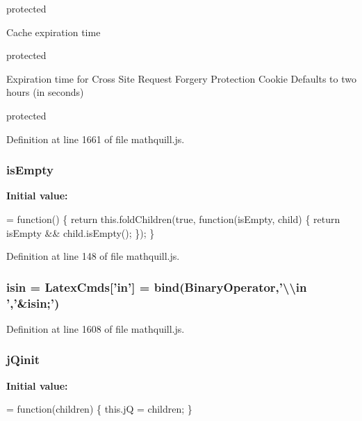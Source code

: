 protected

Cache expiration time

protected

Expiration time for Cross Site Request Forgery Protection Cookie Defaults to two hours (in seconds)

protected 

Definition at line 1661 of file mathquill.\-js.

\subsubsection[{is\-Empty}]{\setlength{\rightskip}{0pt plus 5cm}{\bf \-\_\-} is\-Empty}\label{mathquill_8js_a2066a7b7b922098c23aeb639c27af7ff}
{\bfseries Initial value\-:}
\begin{DoxyCode}
= \textcolor{keyword}{function}() \{
  \textcolor{keywordflow}{return} this.foldChildren(\textcolor{keyword}{true}, \textcolor{keyword}{function}(isEmpty, child) \{
    \textcolor{keywordflow}{return} isEmpty && child.isEmpty();
  \});
\}
\end{DoxyCode}


Definition at line 148 of file mathquill.\-js.

\subsubsection[{isin}]{ isin = {\bf Latex\-Cmds}['in'] = {\bf bind}({\bf Binary\-Operator},'\textbackslash{}\textbackslash{}in ','\&isin;')}\label{mathquill_8js_a406cb9730f935e97d897a2930de969e4}


Definition at line 1608 of file mathquill.\-js.

\subsubsection[{j\-Qinit}]{\setlength{\rightskip}{0pt plus 5cm}{\bf \-\_\-} j\-Qinit}\label{mathquill_8js_a8c4afd4269123840a7c49ac54fb83136}
{\bfseries Initial value\-:}
\begin{DoxyCode}
= \textcolor{keyword}{function}(children) \{
  this.jQ = children;
\}
\end{DoxyCode}


